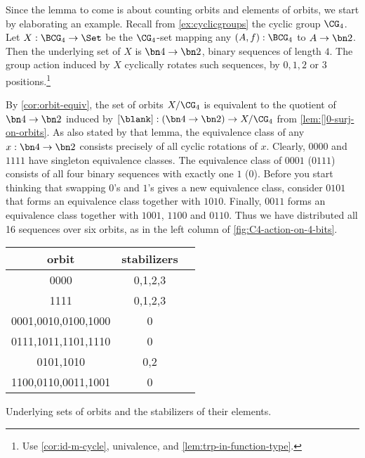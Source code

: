 \begin{example}\label{exa:prep-burnside}
Since the lemma to come is about counting orbits and
elements of orbits, we start by elaborating an example.
Recall from \cref{ex:cyclicgroups} the cyclic group $\CG_4$.
Let $X: \BCG_4\to\Set$ be the $\CG_4$-set mapping any $(A,f):\BCG_4$
to $A\to\bn2$. Then the underlying set of $X$ is $\bn4\to\bn2$,
\ie binary sequences of length $4$. The group action induced by $X$
cyclically rotates such sequences, by $0,1,2$ or $3$ positions.\footnote{%
Use \cref{cor:id-m-cycle}, univalence, and \cref{lem:trp-in-function-type}.}

By \cref{cor:orbit-equiv}, the set of orbits $X/\CG_4$ is
equivalent to the quotient of $\bn4\to\bn2$ induced by 
$[\blank] : (\bn4\to\bn2) \to X/\CG_4$ from \cref{lem:[]0-surj-on-orbits}.
As also stated by that lemma, the equivalence class of any $x:\bn4\to\bn2$
consists precisely of all cyclic rotations of $x$. Clearly, 
$0000$ and $1111$ have singleton equivalence classes.
The equivalence class of $0001$ ($0111$) consists of all four binary 
sequences with exactly one $1$ ($0$).  Before you start thinking that
swapping $0$'s and $1$'s gives a new equivalence class, consider 
$0101$ that forms an equivalence class together with $1010$.
Finally, $0011$ forms an equivalence class together with $1001$,
$1100$ and $0110$. Thus we have distributed all 16 sequences over
six orbits, as in the left column of \cref{fig:C4-action-on-4-bits}.

\begin{marginfigure}\label{fig:C4-action-on-4-bits}
\begin{tabular}{ccc} \toprule
 orbit & stabilizers \\ \midrule
 0000 & 0,1,2,3 \\
 1111 & 0,1,2,3 \\
 0001,0010,0100,1000 & 0 \\
 0111,1011,1101,1110 & 0\\
 0101,1010 & 0,2\\
 1100,0110,0011,1001 & 0\\ \bottomrule
\end{tabular}
\caption{\label{fig:C4-action-on-4-bits}
Underlying sets of orbits and the stabilizers of their elements.}
\end{marginfigure}


\end{example}
